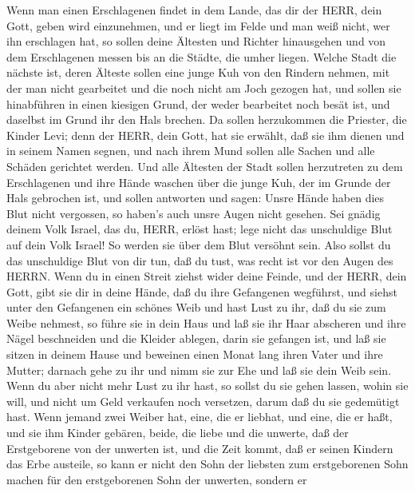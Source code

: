  Wenn man einen Erschlagenen findet in dem Lande, das dir
der HERR, dein Gott, geben wird einzunehmen, und er liegt im Felde und
man weiß nicht, wer ihn erschlagen hat,  so sollen deine
Ältesten und Richter hinausgehen und von dem Erschlagenen messen bis an
die Städte, die umher liegen.  Welche Stadt die nächste ist,
deren Älteste sollen eine junge Kuh von den Rindern nehmen, mit der man
nicht gearbeitet und die noch nicht am Joch gezogen hat, 
und sollen sie hinabführen in einen kiesigen Grund, der weder bearbeitet
noch besät ist, und daselbst im Grund ihr den Hals brechen. 
Da sollen herzukommen die Priester, die Kinder Levi; denn der HERR, dein
Gott, hat sie erwählt, daß sie ihm dienen und in seinem Namen segnen,
und nach ihrem Mund sollen alle Sachen und alle Schäden gerichtet
werden.  Und alle Ältesten der Stadt sollen herzutreten zu
dem Erschlagenen und ihre Hände waschen über die junge Kuh, der im
Grunde der Hals gebrochen ist,  und sollen antworten und
sagen: Unsre Hände haben dies Blut nicht vergossen, so haben's auch
unsre Augen nicht gesehen.  Sei gnädig deinem Volk Israel,
das du, HERR, erlöst hast; lege nicht das unschuldige Blut auf dein Volk
Israel! So werden sie über dem Blut versöhnt sein.  Also
sollst du das unschuldige Blut von dir tun, daß du tust, was recht ist
vor den Augen des HERRN.  Wenn du in einen Streit ziehst
wider deine Feinde, und der HERR, dein Gott, gibt sie dir in deine
Hände, daß du ihre Gefangenen wegführst,  und siehst unter
den Gefangenen ein schönes Weib und hast Lust zu ihr, daß du sie zum
Weibe nehmest,  so führe sie in dein Haus und laß sie ihr
Haar abscheren und ihre Nägel beschneiden  und die Kleider
ablegen, darin sie gefangen ist, und laß sie sitzen in deinem Hause und
beweinen einen Monat lang ihren Vater und ihre Mutter; darnach gehe zu
ihr und nimm sie zur Ehe und laß sie dein Weib sein.  Wenn
du aber nicht mehr Lust zu ihr hast, so sollst du sie gehen lassen,
wohin sie will, und nicht um Geld verkaufen noch versetzen, darum daß du
sie gedemütigt hast.  Wenn jemand zwei Weiber hat, eine,
die er liebhat, und eine, die er haßt, und sie ihm Kinder gebären,
beide, die liebe und die unwerte, daß der Erstgeborene von der unwerten
ist,  und die Zeit kommt, daß er seinen Kindern das Erbe
austeile, so kann er nicht den Sohn der liebsten zum erstgeborenen Sohn
machen für den erstgeborenen Sohn der unwerten,  sondern er
